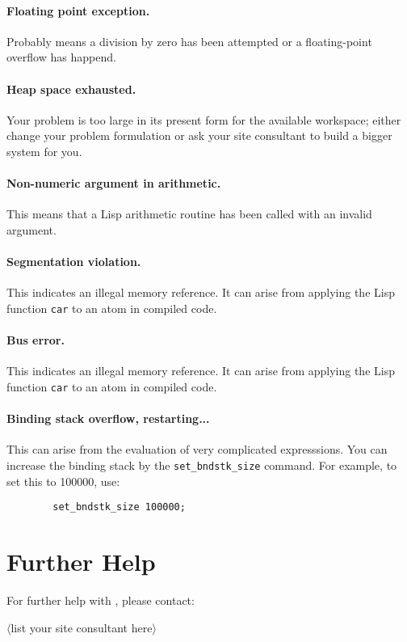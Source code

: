 \paragraph{Floating point exception.} Probably means a division by zero
has been attempted or a floating-point overflow has happend.

\paragraph{Heap space exhausted.} Your problem is too large in its present
form for the available workspace; either change your problem formulation
or ask your site consultant to build a bigger system for you.

\paragraph{Non-numeric argument in arithmetic.} This means that a Lisp
arithmetic routine has been called with an invalid argument.

\paragraph{Segmentation violation.} This indicates an illegal memory
reference.  It can arise from applying the Lisp function {\tt car} to an
atom in compiled code.

\paragraph{Bus error.} This indicates an illegal memory reference.  It
can arise from applying the Lisp function {\tt car} to an atom in compiled
code.

\paragraph{Binding stack overflow, restarting...} This can arise from 
the evaluation of
very complicated expresssions. You can increase the binding stack by the
\verb|set_bndstk_size| command.  For example, to set this to 100000, use:
\begin{verbatim}
        set_bndstk_size 100000;
\end{verbatim}
\section{Further Help}
For further help with {\REDUCE}, please contact:
\begin{center}
$\langle$list your site consultant here$\rangle$
\end{center}


